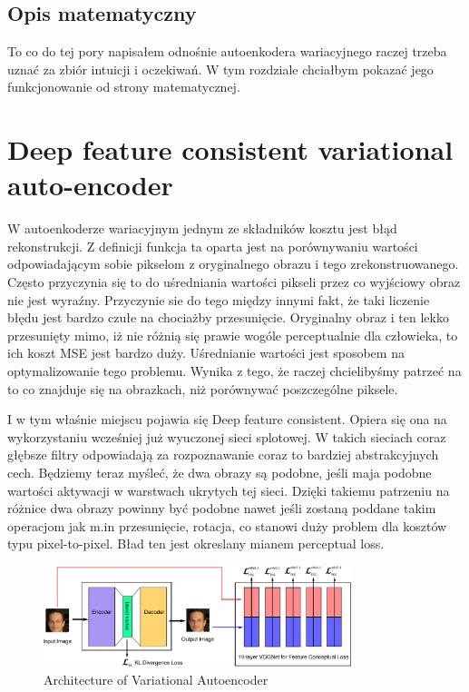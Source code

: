 \subsection{Opis matematyczny}

To co do tej pory napisałem odnośnie autoenkodera wariacyjnego raczej trzeba uznać za zbiór intuicji i oczekiwań. W tym rozdziale chciałbym pokazać jego funkcjonowanie od strony matematycznej.



\section{Deep feature consistent variational auto-encoder}

W autoenkoderze wariacyjnym jednym ze składników kosztu jest błąd rekonstrukcji. Z definicji funkcja ta oparta jest na porównywaniu wartości odpowiadającym sobie pikselom z oryginalnego obrazu i tego zrekonstruowanego. Często przyczynia się to do uśredniania wartości pikseli przez co wyjściowy obraz nie jest wyraźny. Przyczynie sie do tego między innymi fakt, że taki liczenie błędu jest bardzo czułe na chociażby przesunięcie. Oryginalny obraz i ten lekko przesunięty mimo, iż nie różnią się prawie wogóle perceptualnie dla człowieka, to ich koszt MSE jest bardzo duży. Uśrednianie wartości jest sposobem na optymalizowanie tego problemu. Wynika z tego, że raczej chcielibyśmy patrzeć na to co znajduje się na obrazkach, niż porównywać poszczególne piksele.

I w tym właśnie miejscu pojawia się Deep feature consistent. Opiera się ona na wykorzystaniu wcześniej już wyuczonej sieci splotowej. W takich sieciach coraz głębsze filtry odpowiadają za rozpoznawanie coraz to bardziej abstrakcyjnych cech. Będziemy teraz myśleć, że dwa obrazy są podobne, jeśli maja podobne wartości aktywacji w warstwach ukrytych tej sieci. Dzięki takiemu patrzeniu na różnice dwa obrazy powinny być podobne nawet jeśli zostaną poddane takim operacjom jak m.in przesunięcie, rotacja, co stanowi duży problem dla kosztów typu pixel-to-pixel. Bład ten jest okreslany mianem perceptual loss.

\begin{figure}[h!]
    \centering
    \includegraphics[width=0.8\textwidth]{images/dfc_vae}
    \caption{Architecture of Variational Autoencoder}
    \label{fig:dfc_vae}
\end{figure}

